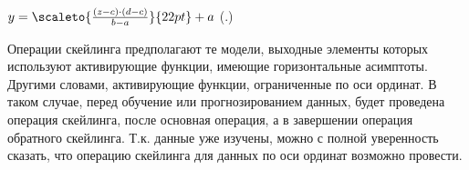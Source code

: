 {  \formulaspace \par \redline
    $y = \scaleto{\frac{\left(z - c\right) \cdot \left(d - c\right)}{b - a}}{22pt} + a$
    \hfill (\thechaptercntr .\theformulacntr) \redline
  \formulaspace \addtocounter{formulacntr}{1}

  \par \redline Операции скейлинга предполагают те модели, выходные элементы которых используют активирующие функции, имеющие горизонтальные асимптоты. Другими словами, активирующие функции, ограниченные по оси ординат. В таком случае, перед обучение или прогнозированием данных, будет проведена операция скейлинга, после основная операция, а в завершении операция обратного скейлинга. Т.к. данные уже изучены, можно с полной уверенность сказать, что операцию скейлинга для данных по оси ординат возможно провести. 

  \par
}

\setcounter{subchaptercntr}{1}
\setcounter{formulacntr}{1}
\setcounter{imagecntr}{1}
\setcounter{tablecntr}{1}
